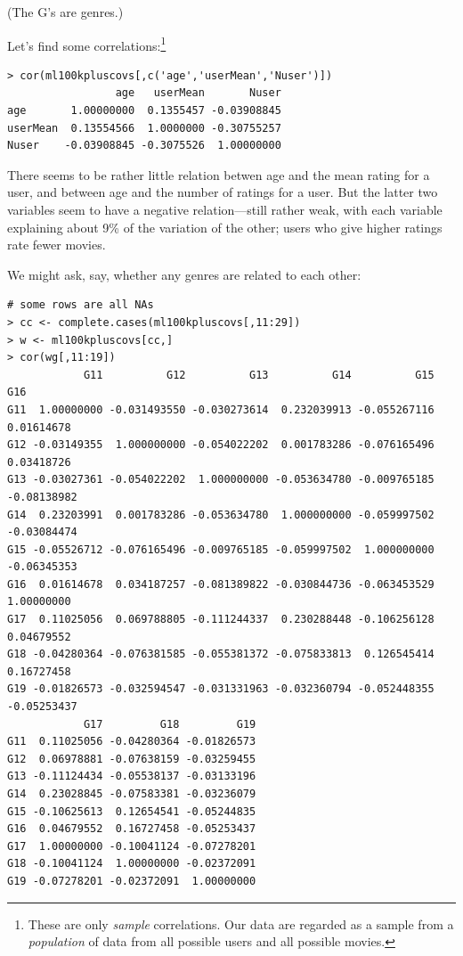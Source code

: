 (The G's are genres.)

Let's find some correlations:\footnote{These are only \textit{sample}
correlations.  Our data are regarded as a sample from a \textit{population}
of data from all possible users and all possible movies.}

\begin{lstlisting}
> cor(ml100kpluscovs[,c('age','userMean','Nuser')])
                 age   userMean       Nuser
age       1.00000000  0.1355457 -0.03908845
userMean  0.13554566  1.0000000 -0.30755257
Nuser    -0.03908845 -0.3075526  1.00000000
\end{lstlisting}

There seems to be rather little relation betwen age and the mean rating
for a user, and between age and the number of ratings for a user.  But
the latter two variables seem to have a negative relation---still rather
weak, with each variable explaining about 9\% of the variation of the
other; users who give higher ratings rate fewer movies.

We might ask, say, whether any genres are related to each other:

\begin{lstlisting}
# some rows are all NAs
> cc <- complete.cases(ml100kpluscovs[,11:29]) 
> w <- ml100kpluscovs[cc,]
> cor(wg[,11:19])
            G11          G12          G13          G14          G15         G16
G11  1.00000000 -0.031493550 -0.030273614  0.232039913 -0.055267116  0.01614678
G12 -0.03149355  1.000000000 -0.054022202  0.001783286 -0.076165496  0.03418726
G13 -0.03027361 -0.054022202  1.000000000 -0.053634780 -0.009765185 -0.08138982
G14  0.23203991  0.001783286 -0.053634780  1.000000000 -0.059997502 -0.03084474
G15 -0.05526712 -0.076165496 -0.009765185 -0.059997502  1.000000000 -0.06345353
G16  0.01614678  0.034187257 -0.081389822 -0.030844736 -0.063453529  1.00000000
G17  0.11025056  0.069788805 -0.111244337  0.230288448 -0.106256128  0.04679552
G18 -0.04280364 -0.076381585 -0.055381372 -0.075833813  0.126545414  0.16727458
G19 -0.01826573 -0.032594547 -0.031331963 -0.032360794 -0.052448355 -0.05253437
            G17         G18         G19
G11  0.11025056 -0.04280364 -0.01826573
G12  0.06978881 -0.07638159 -0.03259455
G13 -0.11124434 -0.05538137 -0.03133196
G14  0.23028845 -0.07583381 -0.03236079
G15 -0.10625613  0.12654541 -0.05244835
G16  0.04679552  0.16727458 -0.05253437
G17  1.00000000 -0.10041124 -0.07278201
G18 -0.10041124  1.00000000 -0.02372091
G19 -0.07278201 -0.02372091  1.00000000
\end{lstlisting}

